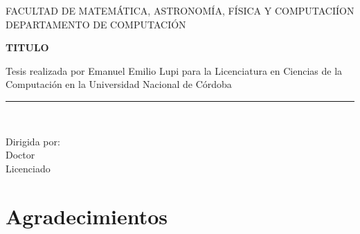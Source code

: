 \documentclass[a4paper,openright,12pt, oneside]{book}
\begin{document}
\begin{titlepage}

\begin{center}
\vspace*{-1in}


FACULTAD DE MATEM\'ATICA, ASTRONOM\'IA, F\'ISICA Y COMPUTACI\'ION\\
\vspace*{0.15in}
DEPARTAMENTO DE COMPUTACI\'ON \\
\vspace*{0.6in}
\begin{large}
\end{large}
\vspace*{0.2in}
\begin{Large}
\textbf{TITULO} \\
\end{Large}
\vspace*{0.3in}
\begin{large}
Tesis realizada por Emanuel Emilio Lupi para la Licenciatura en Ciencias de la Computaci\'on en la Universidad Nacional de C\'ordoba\end{large}

\vspace*{0.3in}
\rule{80mm}{0.1mm}\\
\vspace*{0.1in}
\begin{large}
Dirigida por: \\
Doctor\\
Licenciado\\
\vspace*{0.1in}
\end{large}
\end{center}
\end{titlepage}

\mbox{}
\thispagestyle{empty}

\chapter*{Agradecimientos} %
\end{document}
